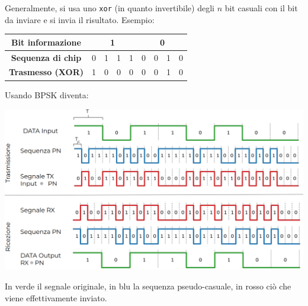 Generalmente, si usa uno \texttt{xor} (in quanto invertibile) degli $n$ bit casuali con il bit da inviare e si invia il risultato. Esempio: 
\begin{center}
	\begin{tabular}{|c|c|c|c|c|c|c|c|c|}
		\hline
		\multicolumn{1}{|c|}{\textbf{Bit informazione}} & \multicolumn{4}{c|}{\textbf{1}} & \multicolumn{4}{c|}{\textbf{0}} \\ 
		\hline
		\textbf{Sequenza di chip} & 0 & 1 & 1 & 1 & 0 & 0 & 1 & 0 \\ 
		\hline
		\textbf{Trasmesso (XOR)} & 1 & 0 & 0 & 0 & 0 & 0 & 1 & 0\\ 
		\hline
	\end{tabular}
\end{center}
Usando BPSK diventa: 
\begin{center}
	\includegraphics[width=0.95\linewidth]{img/wireless/DSSS1}
\end{center}
In verde il {\color{green} segnale originale}, in blu la {\color{blue} sequenza pseudo-casuale}, in rosso ciò che viene {\color{red} effettivamente inviato}.\\


